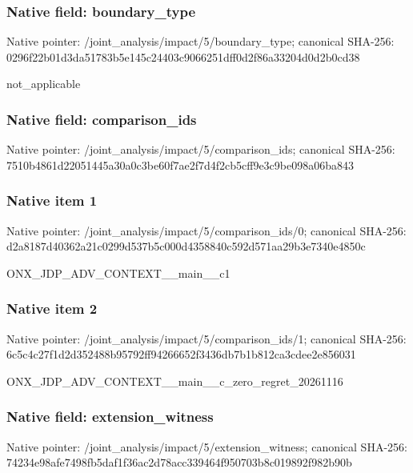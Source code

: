 \documentclass[10pt,a4paper]{article}
\begin{document}
\subsubsection{Native field: boundary\_\allowbreak{}type}
Native pointer: /joint\_\allowbreak{}analysis/impact/5/boundary\_\allowbreak{}type; canonical SHA-256: 0296f22b01d3da51783b5e145c24403c9066251dff0d2f86a33204d0d2b0cd38

\begingroup\raggedright\sloppy not\_\allowbreak{}applicable\par\endgroup

\subsubsection{Native field: comparison\_\allowbreak{}ids}
Native pointer: /joint\_\allowbreak{}analysis/impact/5/comparison\_\allowbreak{}ids; canonical SHA-256: 7510b4861d22051445a30a0c3be60f7ae2f7d4f2cb5cff9e3c9be098a06ba843

\subsubsection{Native item 1}
Native pointer: /joint\_\allowbreak{}analysis/impact/5/comparison\_\allowbreak{}ids/0; canonical SHA-256: d2a8187d40362a21c0299d537b5c000d4358840c592d571aa29b3e7340e4850c

\begingroup\raggedright\sloppy ONX\_\allowbreak{}JDP\_\allowbreak{}ADV\_\allowbreak{}CONTEXT\_\allowbreak{}\_\allowbreak{}main\_\allowbreak{}\_\allowbreak{}c1\par\endgroup

\subsubsection{Native item 2}
Native pointer: /joint\_\allowbreak{}analysis/impact/5/comparison\_\allowbreak{}ids/1; canonical SHA-256: 6c5c4c27f1d2d352488b95792ff94266652f3436db7b1b812ca3cdee2e856031

\begingroup\raggedright\sloppy ONX\_\allowbreak{}JDP\_\allowbreak{}ADV\_\allowbreak{}CONTEXT\_\allowbreak{}\_\allowbreak{}main\_\allowbreak{}\_\allowbreak{}c\_\allowbreak{}zero\_\allowbreak{}regret\_\allowbreak{}20261116\par\endgroup

\subsubsection{Native field: extension\_\allowbreak{}witness}
Native pointer: /joint\_\allowbreak{}analysis/impact/5/extension\_\allowbreak{}witness; canonical SHA-256: 74234e98afe7498fb5daf1f36ac2d78acc339464f950703b8c019892f982b90b
\end{document}
